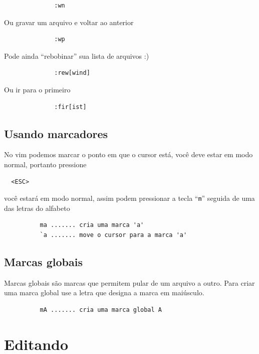 \documentclass[10pt,a4paper,openany]{book}
\begin{document}
\begin{verbatim}
			  :wn
\end{verbatim}

Ou gravar um arquivo e voltar ao anterior

\begin{verbatim}
			  :wp
\end{verbatim}

Pode ainda ``rebobinar'' sua lista de arquivos :)

\begin{verbatim}
			  :rew[wind]
\end{verbatim}

Ou ir para o primeiro

\begin{verbatim}
			  :fir[ist]
\end{verbatim}

\section{Usando marcadores}
\label{Usando marcadores}

No vim podemos marcar o ponto em que o cursor está, você deve estar em
modo normal, portanto pressione

\begin{verbatim}
  <ESC>
\end{verbatim}

você estará em modo normal, assim podem pressionar a tecla ``\verb+m+''
seguida de uma das letras do alfabeto

\begin{verbatim}
		  ma ....... cria uma marca 'a'
		  `a ....... move o cursor para a marca 'a'
\end{verbatim}

\section{Marcas globais}
\label{Marcas globais}
Marcas globais são marcas que permitem pular de um arquivo a outro.
Para criar uma marca global use a letra que designa a marca em
maiúsculo.

\begin{verbatim}
		  mA ....... cria uma marca global A
\end{verbatim}

\chapter{Editando}
\label{Editando}
\end{document}
